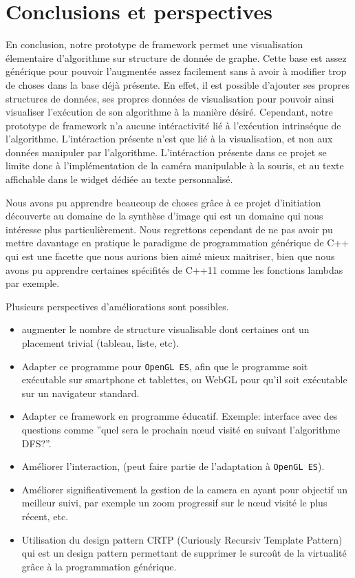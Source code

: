 \documentclass[a4paper, 11pt]{article}
\begin{document}
\section{Conclusions et perspectives}
En conclusion, notre prototype de framework permet une visualisation élementaire d'algorithme sur structure de donnée de graphe. Cette base est assez générique pour pouvoir l'augmentée assez facilement sans à avoir à modifier trop de choses dans la base déjà présente. En effet, il est possible d'ajouter ses propres structures de données, ses propres données de visualisation pour pouvoir ainsi visualiser l'exécution de son algorithme à la manière désiré. Cependant, notre prototype de framework n'a aucune intéractivité lié à l'exécution intrinséque de l'algorithme. L'intéraction présente n'est que lié à la visualisation, et non aux données manipuler par l'algorithme. L'intéraction présente dans ce projet se limite donc à l'implémentation de la caméra manipulable à la souris, et au texte affichable dans le widget dédiée au texte personnalisé.

Nous avons pu apprendre beaucoup de choses grâce à ce projet d'initiation découverte au domaine de la synthèse d'image qui est un domaine qui nous intéresse plus particulièrement. Nous regrettons cependant de ne pas avoir pu mettre davantage en pratique le paradigme de programmation générique de C++ qui est une facette que nous aurions bien aimé mieux maitriser, bien que nous avons pu apprendre certaines spécifités de C++11 comme les fonctions lambdas par exemple.

Plusieurs perspectives d'améliorations sont possibles.
\begin{itemize}
\item augmenter le nombre de structure visualisable dont certaines ont un placement trivial (tableau, liste, etc).
\item Adapter ce programme pour \texttt{OpenGL ES}, afin que le programme soit exécutable sur smartphone et tablettes, ou WebGL pour qu'il soit exécutable sur un navigateur standard.
\item Adapter ce framework en programme éducatif. Exemple: interface avec des questions comme ''quel sera le prochain nœud visité en suivant l'algorithme DFS?''.
\item Améliorer l'interaction, (peut faire partie de l'adaptation à \texttt{OpenGL ES}).
\item Améliorer significativement la gestion de la camera en ayant pour objectif un meilleur suivi, par exemple un zoom progressif sur le nœud visité le plus récent, etc.
\item Utilisation du design pattern CRTP (Curiously Recursiv Template Pattern) qui est un design pattern permettant de supprimer le surcoût de la virtualité grâce à la programmation générique.
\end{itemize}
\end{document}
